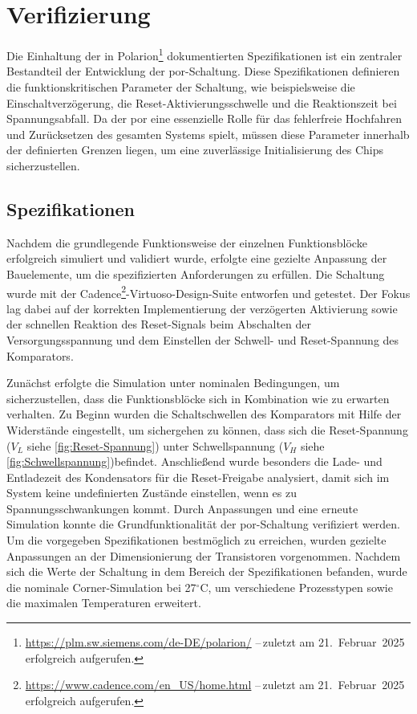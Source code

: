\chapter{Verifizierung}\label{chap:Verifizierung}
Die Einhaltung der in Polarion\footnote{\url{https://plm.sw.siemens.com/de-DE/polarion/} --\,zuletzt am 21.~Februar~2025 erfolgreich aufgerufen.} dokumentierten Spezifikationen ist ein zentraler Bestandteil der Entwicklung der \gls{por}-Schaltung. Diese Spezifikationen definieren die funktionskritischen Parameter der Schaltung, wie beispielsweise die Einschaltverzögerung, die Reset-Aktivierungsschwelle und die Reaktionszeit bei Spannungsabfall. Da der \gls{por} eine essenzielle Rolle für das fehlerfreie Hochfahren und Zurücksetzen des gesamten Systems spielt, müssen diese Parameter innerhalb der definierten Grenzen liegen, um eine zuverlässige Initialisierung des Chips sicherzustellen.

\section{Spezifikationen}
Nachdem die grundlegende Funktionsweise der einzelnen Funktionsblöcke erfolgreich simuliert und validiert wurde, erfolgte eine gezielte Anpassung der Bauelemente, um die spezifizierten Anforderungen zu erfüllen. Die Schaltung wurde mit der Cadence\footnote{\url{https://www.cadence.com/en_US/home.html}  --\,zuletzt am 21.~Februar~2025 erfolgreich aufgerufen.}-Virtuoso-Design-Suite entworfen und getestet. Der Fokus lag dabei auf der korrekten Implementierung der verzögerten Aktivierung sowie der schnellen Reaktion des Reset-Signals beim Abschalten der Versorgungsspannung und dem Einstellen der Schwell- und Reset-Spannung des Komparators. 

Zunächst erfolgte die Simulation unter nominalen Bedingungen, um sicherzustellen, dass die Funktionsblöcke sich in Kombination wie zu erwarten verhalten. Zu Beginn wurden die Schaltschwellen des Komparators mit Hilfe der Widerstände eingestellt, um sichergehen zu können, dass sich die Reset-Spannung ($V_L$ siehe \autoref{fig:Reset-Spannung}) unter Schwellspannung ($V_H$ siehe \autoref{fig:Schwellspannung})befindet. Anschließend wurde besonders die Lade- und Entladezeit des Kondensators für die Reset-Freigabe analysiert, damit sich im System keine undefinierten Zustände einstellen, wenn es zu Spannungsschwankungen kommt. Durch Anpassungen und eine erneute Simulation konnte die Grundfunktionalität der \gls{por}-Schaltung verifiziert werden. Um die vorgegeben Spezifikationen bestmöglich zu erreichen, wurden gezielte Anpassungen an der Dimensionierung der Transistoren vorgenommen. Nachdem sich die Werte der Schaltung in dem Bereich der Spezifikationen befanden, wurde die nominale Corner-Simulation bei 27$^{\circ}$C, um verschiedene Prozesstypen sowie die maximalen Temperaturen erweitert. 

